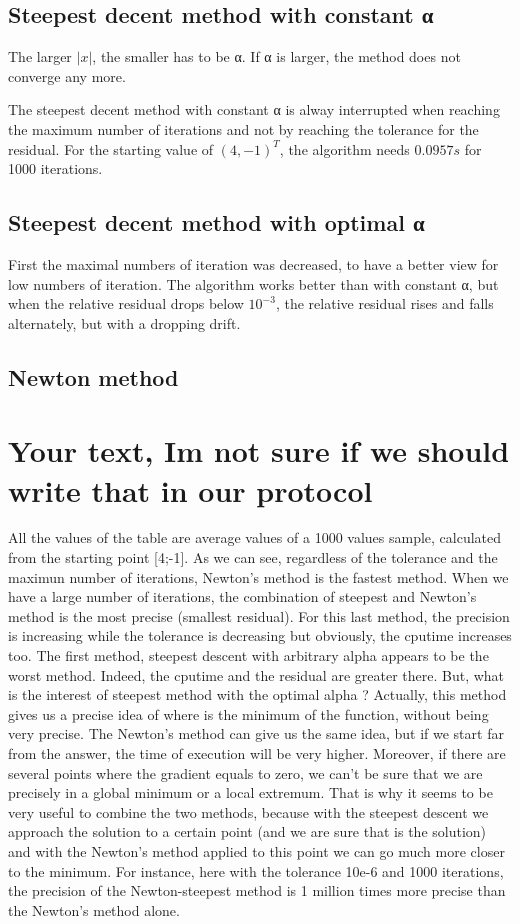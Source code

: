 \documentclass[a4paper,12pt]{article}
\begin{document}
\subsection{Steepest decent method with constant α}
The larger $|x|$, the smaller has to be α. %
If α is larger, the method does not converge any more.

The steepest decent method with constant α is alway interrupted when reaching the maximum number of iterations and not by reaching the tolerance for the residual. For the starting value of $(4,-1)^T$, the algorithm needs $0.0957s$ for 1000 iterations.


\subsection{Steepest decent method with optimal α}
First the maximal numbers of iteration was decreased, to have a better view for low numbers of iteration.
The algorithm works better than with constant α, but when the relative residual drops below $10^{-3}$, the relative residual rises and falls alternately, but with a dropping drift.
\subsection{Newton method}



\section{Your text, Im not sure if we should write that in our protocol}
All the values of the table are average values of a 1000 values sample, calculated from the starting point [4;-1].
As we can see, regardless of the tolerance and the maximun number of iterations, Newton's method is the fastest method. 
When we have a large number of iterations, the combination of steepest and Newton's method is the most precise (smallest residual). 
For this last method, the precision is increasing while the tolerance is decreasing but obviously, the cputime increases too.
The first method, steepest descent with arbitrary alpha appears to be the worst method. Indeed, the cputime and the residual are greater there. 
But, what is the interest of steepest method with the optimal alpha ? 
Actually, this method gives us a precise idea of where is the minimum of the function, without being very precise. 
The Newton's method can give us the same idea, but if we start far from the answer, the time of execution will be very higher. 
Moreover, if there are several points where the gradient equals to zero, we can't be sure that we are precisely in a global minimum or a local extremum. 
That is why it seems to be very useful to combine the two methods, because with the steepest descent we approach the solution to a certain point (and we are sure that is the solution) and with the Newton's method applied to this point we can go much more closer to the minimum. 
For instance, here with the tolerance 10e-6 and 1000 iterations, the precision of the Newton-steepest method is 1 million times more precise than the Newton's method alone. 
\end{document}
